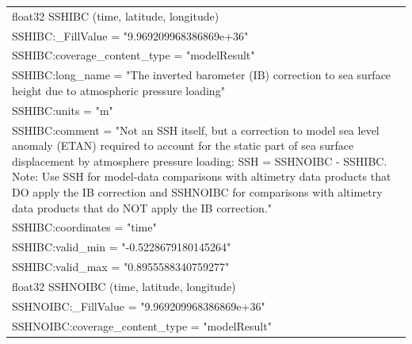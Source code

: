 \begin{longtable}{|p{\textwidth}|}
\hspace{0.5cm}float32 SSHIBC (time, latitude, longitude)\\
\hspace{0.5cm}\hspace{0.5cm}SSHIBC:\_FillValue = "9.969209968386869e+36"\\
\hspace{0.5cm}\hspace{0.5cm}SSHIBC:coverage\_content\_type = "modelResult"\\
\hspace{0.5cm}\hspace{0.5cm}SSHIBC:long\_name = "The inverted barometer (IB) correction to sea surface height due to atmospheric pressure loading"\\
\hspace{0.5cm}\hspace{0.5cm}SSHIBC:units = "m"\\
\hspace{0.5cm}\hspace{0.5cm}SSHIBC:comment = "Not an SSH itself, but a correction to model sea level anomaly (ETAN) required to account for the static part of sea surface displacement by atmosphere pressure loading: SSH = SSHNOIBC - SSHIBC. Note: Use SSH for model-data comparisons with altimetry data products that DO apply the IB correction and SSHNOIBC for comparisons with altimetry data products that do NOT apply the IB correction."\\
\hspace{0.5cm}\hspace{0.5cm}SSHIBC:coordinates = "time"\\
\hspace{0.5cm}\hspace{0.5cm}SSHIBC:valid\_min = "-0.5228679180145264"\\
\hspace{0.5cm}\hspace{0.5cm}SSHIBC:valid\_max = "0.8955588340759277"\\
\hspace{0.5cm}float32 SSHNOIBC (time, latitude, longitude)\\
\hspace{0.5cm}\hspace{0.5cm}SSHNOIBC:\_FillValue = "9.969209968386869e+36"\\
\hspace{0.5cm}\hspace{0.5cm}SSHNOIBC:coverage\_content\_type = "modelResult"\\

\end{longtable}

